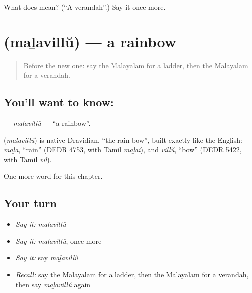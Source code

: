 \begin{tcolorbox}[breakable,colback=teal!4,colframe=teal!35!black,title={Before you move on}]
What does  mean? (\textquotedblleft{}A verandah\textquotedblright{}.) Say it once more.
\end{tcolorbox}
\section[\texorpdfstring{\ml{മഴവില്ല്} (maḻavillŭ)}{മഴവില്ല് (maḻavillŭ)}]{ (maḻavillŭ) — a rainbow}

\label{lesson:ML-C160-malavillu}



\begin{quote}
Before the new one: say the Malayalam for a ladder, then the Malayalam for a verandah.
\end{quote}

\subsection*{You'll want to know: }
\textbf{} — \emph{maḻavillŭ} — \textquotedblleft{}a rainbow\textquotedblright{}.

\begin{cousinweb}
\textbf{} (\emph{maḻavillŭ}) is native Dravidian, \textquotedblleft{}the rain bow\textquotedblright{}, built exactly like the English: \emph{maḻa}, \textquotedblleft{}rain\textquotedblright{} (DEDR 4753, with Tamil \emph{maḻai}), and \emph{villŭ}, \textquotedblleft{}bow\textquotedblright{} (DEDR 5422, with Tamil \emph{vil}).
\end{cousinweb}

\begin{grammarlens}[title={What you've built}]
One more word for this chapter.
\end{grammarlens}

\subsection*{Your turn}
\begin{itemize}
\raggedright
  \item \emph{Say it:} \emph{maḻavillŭ}
  \item \emph{Say it:} \emph{maḻavillŭ}, once more
  \item \emph{Say it:} say \emph{maḻavillŭ}
  \item \emph{Recall:} say the Malayalam for a ladder, then the Malayalam for a verandah, then say \emph{maḻavillŭ} again
\end{itemize}

